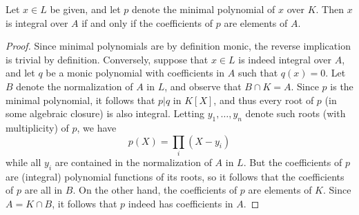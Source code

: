 \begin{proposition}
  Let $x \in L$ be given, and let $p$ denote the minimal polynomial of $x$ over $K$.
  Then $x$ is integral over $A$ if and only if the coefficients of $p$ are elements of $A$.
\end{proposition}
\begin{proof}
  Since minimal polynomials are by definition monic, the reverse implication is trivial by definition.
  Conversely, suppose that $x \in L$ is indeed integral over $A$, and let $q$ be a monic polynomial with coefficients in $A$ such that $q(x) = 0$.
  Let $B$ denote the normalization of $A$ in $L$, and observe that $B \cap K = A$.
  Since $p$ is the minimal polynomial, it follows that $p | q$ in $K[X]$, and thus every root of $p$ (in some algebraic closure) is also integral.
  Letting $y_{1},\ldots,y_{n}$ denote such roots (with multiplicity) of $p$, we have
  \[ p(X) = \prod_{i} (X - y_{i}) \]
  while all $y_{i}$ are contained in the normalization of $A$ in $L$.
  But the coefficients of $p$ are (integral) polynomial functions of its roots, so it follows that the coefficients of $p$ are all in $B$.
  On the other hand, the coefficients of $p$ are elements of $K$.
  Since $A = K \cap B$, it follows that $p$ indeed has coefficients in $A$.
\end{proof}

